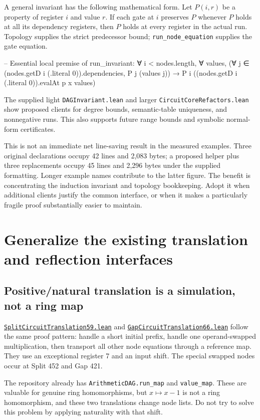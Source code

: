 \documentclass[11pt,letterpaper]{article}
\newcommand{\code}[1]{\nolinkurl{#1}}
\newcommand{\src}[2]{\href{https://github.com/VladimirReshetnikov/ProveIt/blob/60e9c5d620c6c387d932876cfa2d9376f64ea56c/Computability/DiophantineConsistency/Lean/DiophantineConsistency/#1.lean}{\code{#1.lean}}#2}
\begin{document}
A general invariant has the following mathematical form. Let $P(i,r)$ be a
property of register $i$ and value $r$. If each gate at $i$ preserves $P$
whenever $P$ holds at all its dependency registers, then $P$ holds at every
register in the actual run. Topology supplies the strict predecessor bound;
\code{run_node_equation} supplies the gate equation.

\begin{Lean}
-- Essential local premise of run_invariant:
∀ i < nodes.length, ∀ values,
  (∀ j ∈ (nodes.getD i (.literal 0)).dependencies,
    P j (values j)) →
  P i ((nodes.getD i (.literal 0)).evalAt p x values)
\end{Lean}

The supplied light \code{DAGInvariant.lean} and larger
\code{CircuitCoreRefactors.lean} show proposed clients for degree bounds,
semantic-table uniqueness, and nonnegative runs. This also supports future
range bounds and symbolic normal-form certificates.

This is not an immediate net line-saving result in the measured examples.
Three original declarations occupy 42 lines and 2,083 bytes; a proposed helper
plus three replacements occupy 45 lines and 2,296 bytes under the supplied
formatting. Longer example names contribute to the latter figure. The benefit
is concentrating the induction invariant and topology bookkeeping. Adopt it
when additional clients justify the common interface, or when it makes a
particularly fragile proof substantially easier to maintain.

\section{Generalize the existing translation and reflection interfaces}

\subsection{Positive/natural translation is a simulation, not a ring map}

\src{SplitCircuitTranslation59}{ and }
\src{GapCircuitTranslation66}{ follow the same proof pattern: handle a short
initial prefix, handle one operand-swapped multiplication, then transport all
other node equations through a reference map.}
They use an exceptional register 7 and an input shift. The special swapped
nodes occur at Split 452 and Gap 421.

The repository already has \code{ArithmeticDAG.run_map} and
\code{value_map}. These are valuable for genuine ring homomorphisms, but
$x\mapsto x-1$ is not a ring homomorphism, and these two translations change
node lists. Do not try to solve this problem by applying naturality with that
shift.
\end{document}
